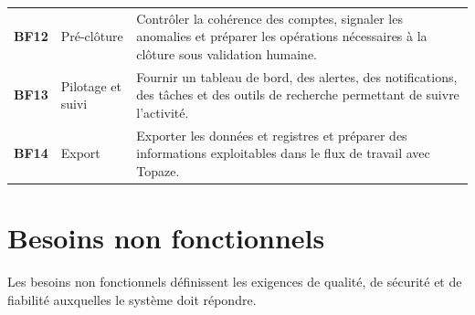 \documentclass[12pt,a4paper,oneside]{report}
\newcommand{\TableId}[1]{\textcolor{ComptaGreen}{\textbf{#1}}}
\begin{document}
\begin{longtable}{|L{1.4cm}|L{5cm}|L{8cm}|}
\TableId{BF12} & Pré-clôture & Contrôler la cohérence des comptes, signaler les anomalies et préparer les opérations nécessaires à la clôture sous validation humaine. \\
\TableId{BF13} & Pilotage et suivi & Fournir un tableau de bord, des alertes, des notifications, des tâches et des outils de recherche permettant de suivre l'activité. \\
\TableId{BF14} & Export & Exporter les données et registres et préparer des informations exploitables dans le flux de travail avec Topaze. \\
\bottomrule
\end{longtable}

\section{Besoins non fonctionnels}

Les besoins non fonctionnels définissent les exigences de qualité, de sécurité et de fiabilité auxquelles le système doit répondre.
\end{document}

